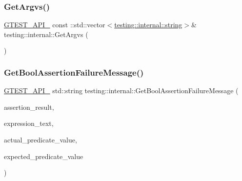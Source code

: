 \mbox{\label{namespacetesting_1_1internal_ad603798345f4e7ccd25368d902c98fc1}} 
\subsubsection{\texorpdfstring{GetArgvs()}{GetArgvs()}}
{\footnotesize\ttfamily \mbox{\hyperlink{gtest-port_8h_aa73be6f0ba4a7456180a94904ce17790}{G\+T\+E\+S\+T\+\_\+\+A\+P\+I\+\_\+}} const \+::std\+::vector$<$\mbox{\hyperlink{namespacetesting_1_1internal_a8e8ff5b11e64078831112677156cb111}{testing\+::internal\+::string}}$>$\& testing\+::internal\+::\+Get\+Argvs (\begin{DoxyParamCaption}{ }\end{DoxyParamCaption})}

\mbox{\label{namespacetesting_1_1internal_aed8d3ad4341f8f2de53440e39c995632}} 
\subsubsection{\texorpdfstring{GetBoolAssertionFailureMessage()}{GetBoolAssertionFailureMessage()}}
{\footnotesize\ttfamily \mbox{\hyperlink{gtest-port_8h_aa73be6f0ba4a7456180a94904ce17790}{G\+T\+E\+S\+T\+\_\+\+A\+P\+I\+\_\+}} std\+::string testing\+::internal\+::\+Get\+Bool\+Assertion\+Failure\+Message (\begin{DoxyParamCaption}\item[{const \mbox{\hyperlink{classtesting_1_1_assertion_result}{Assertion\+Result}} \&}]{assertion\+\_\+result,  }\item[{const char $\ast$}]{expression\+\_\+text,  }\item[{const char $\ast$}]{actual\+\_\+predicate\+\_\+value,  }\item[{const char $\ast$}]{expected\+\_\+predicate\+\_\+value }\end{DoxyParamCaption})}

\mbox{\label{namespacetesting_1_1internal_a374156401da17704099d0c33fa53adfb}} 

